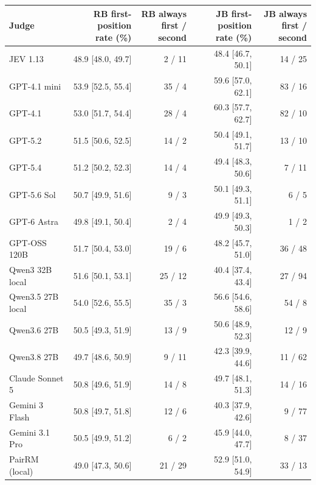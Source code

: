 \begin{tabular}{@{}lrrrr@{}}
\toprule
Judge & \shortstack{RB first-position\\rate (\%)} & \shortstack{RB always\\first / second} & \shortstack{JB first-position\\rate (\%)} & \shortstack{JB always\\first / second} \\
\midrule
JEV 1.13 & 48.9 [48.0, 49.7] & 2 / 11 & 48.4 [46.7, 50.1] & 14 / 25 \\
GPT-4.1 mini & 53.9 [52.5, 55.4] & 35 / 4 & 59.6 [57.0, 62.1] & 83 / 16 \\
GPT-4.1 & 53.0 [51.7, 54.4] & 28 / 4 & 60.3 [57.7, 62.7] & 82 / 10 \\
GPT-5.2 & 51.5 [50.6, 52.5] & 14 / 2 & 50.4 [49.1, 51.7] & 13 / 10 \\
GPT-5.4 & 51.2 [50.2, 52.3] & 14 / 4 & 49.4 [48.3, 50.6] & 7 / 11 \\
GPT-5.6 Sol & 50.7 [49.9, 51.6] & 9 / 3 & 50.1 [49.3, 51.1] & 6 / 5 \\
GPT-6 Astra & 49.8 [49.1, 50.4] & 2 / 4 & 49.9 [49.3, 50.3] & 1 / 2 \\
GPT-OSS 120B & 51.7 [50.4, 53.0] & 19 / 6 & 48.2 [45.7, 51.0] & 36 / 48 \\
Qwen3 32B local & 51.6 [50.1, 53.1] & 25 / 12 & 40.4 [37.4, 43.4] & 27 / 94 \\
Qwen3.5 27B local & 54.0 [52.6, 55.5] & 35 / 3 & 56.6 [54.6, 58.6] & 54 / 8 \\
Qwen3.6 27B & 50.5 [49.3, 51.9] & 13 / 9 & 50.6 [48.9, 52.3] & 12 / 9 \\
Qwen3.8 27B & 49.7 [48.6, 50.9] & 9 / 11 & 42.3 [39.9, 44.6] & 11 / 62 \\
Claude Sonnet 5 & 50.8 [49.6, 51.9] & 14 / 8 & 49.7 [48.1, 51.3] & 14 / 16 \\
Gemini 3 Flash & 50.8 [49.7, 51.8] & 12 / 6 & 40.3 [37.9, 42.6] & 9 / 77 \\
Gemini 3.1 Pro & 50.5 [49.9, 51.2] & 6 / 2 & 45.9 [44.0, 47.7] & 8 / 37 \\
PairRM (local) & 49.0 [47.3, 50.6] & 21 / 29 & 52.9 [51.0, 54.9] & 33 / 13 \\
\bottomrule
\end{tabular}
